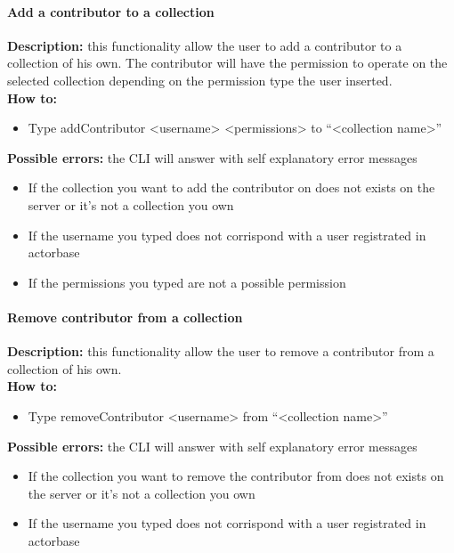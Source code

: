 \documentclass{scalatekids-article}
\begin{document}
\paragraph{Add a contributor to a collection}
\label{sec:addcontributor}
\textbf{Description:} this functionality allow the user to add a contributor 
to a collection of his own. The contributor will have the permission to operate on the selected collection depending on the permission type the user inserted.\\
\textbf{How to:} 
\begin{itemize}
	\item Type addContributor <username> <permissions> to ``<collection name>''
\end{itemize}
\textbf{Possible errors:} the CLI will answer with self explanatory error messages 
\begin{itemize}
	\item If the collection you want to add the contributor on does not exists on the server or it's not a collection you own
	\item If the username you typed does not corrispond with a user registrated in actorbase
	\item If the permissions you typed are not a possible permission
\end{itemize}

\paragraph{Remove contributor from a collection}
\label{sec:removecontributor}
\textbf{Description:} this functionality allow the user to remove a contributor from a collection of his own.\\
\textbf{How to:} 
\begin{itemize}
	\item Type removeContributor <username> from ``<collection name>''
\end{itemize}
\textbf{Possible errors:} the CLI will answer with self explanatory error messages 
\begin{itemize}
	\item If the collection you want to remove the contributor from does not exists on the server or it's not a collection you own
	\item If the username you typed does not corrispond with a user registrated in actorbase
\end{itemize}
\end{document}

